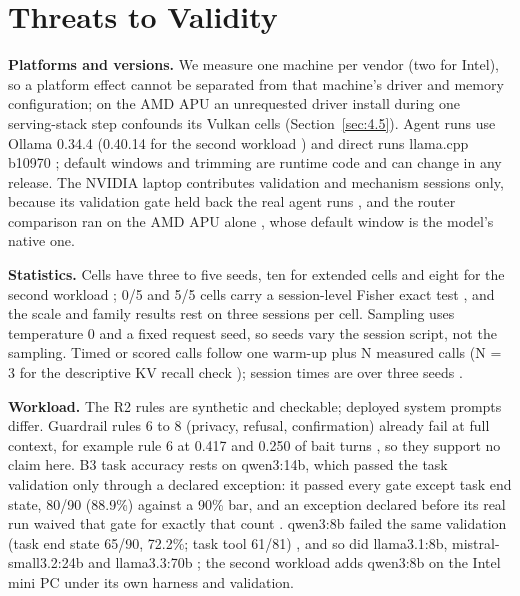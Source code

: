 \documentclass[conference,10pt]{IEEEtran}
\begin{document}
\section{Threats to Validity}\label{sec:4.8}

\textbf{Platforms and versions.} We measure one machine per vendor (two for Intel), so a platform effect cannot be separated from that machine's driver and memory configuration; on the AMD APU an unrequested driver install during one serving-stack step confounds its Vulkan cells (Section~\ref{sec:4.5}). Agent runs use Ollama 0.34.4 %
(0.40.14 for the second workload%
) and direct runs llama.cpp b10970%
; default windows and trimming are runtime code and can change in any release. The NVIDIA laptop contributes validation and mechanism sessions only, because its validation gate held back the real agent runs%
, and the router comparison ran on the AMD APU alone%
, whose default window is the model's native one.

\textbf{Statistics.} Cells have three %
to five %
seeds, ten for extended cells %
and eight for the second workload%
; 0/5 and 5/5 cells carry a session-level Fisher exact test%
, and the scale and family results rest on three sessions per cell. Sampling uses temperature 0 %
and a fixed request seed, so seeds vary the session script, not the sampling. Timed or scored calls follow one warm-up plus N measured calls (N = 3 for the descriptive KV recall check%
); session times are over three seeds%
.

\textbf{Workload.} The R2 rules are synthetic and checkable; deployed system prompts differ. Guardrail rules 6 to 8 (privacy, refusal, confirmation) already fail at full context, for example rule 6 at 0.417 and 0.250 of bait turns%
, so they support no claim here. B3 task accuracy rests on qwen3:14b, which passed the task validation only through a declared exception: it passed every gate except task end state, 80/90 (88.9\%) against a 90\% bar, and an exception declared before its real run waived that gate for exactly that count%
. qwen3:8b failed the same validation (task end state 65/90, 72.2\%; task tool 61/81)%
, and so did llama3.1:8b, mistral-small3.2:24b and llama3.3:70b%
; the second workload adds qwen3:8b on the Intel mini PC under its own harness and validation.
\end{document}

